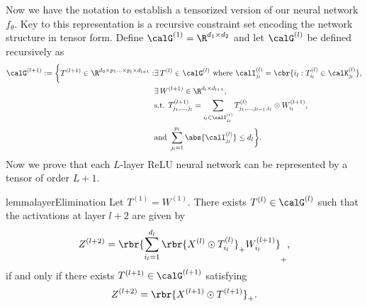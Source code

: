 Now we have the notation to establish a tensorized version of our neural
network \( f_\theta \).
Key to this representation is a recursive constraint set encoding the network
structure in tensor form.
Define \( \calG^{(1)} = \R^{d_1 \times d_2} \) and let \( \calG^{(l)} \)
be defined recursively as
\begin{equation}\label{eq:rank-tensor-decomp}
    \begin{aligned}
        \calG^{(l+1)}
        :=
        \bigg\{
        T^{(l+1)} \in \R^{d_{0} \times p_{1} \ldots \times p_{l} \times d_{l+1}}
        : & \exists \, T^{(l)} \in \calG^{(l)} \text{ where }
        \calI^{(l)}_{j_{l}} = \cbr{ i_l : T^{(l)}_{i_l} \in \calK^{(l)}_{j_{l}}}, \\
          & \exists \, W^{(l+1)} \in \R^{d_l \times d_{l+1}},                     \\
          & \text{s.t. } T^{(l+1)}_{j_1, \ldots, j_{l}}
        = \sum_{i_l \in \calI^{(l)}_{j_l}} T^{(l)}_{j_1, \ldots, j_{l-1}, i_{l}}
        \otimes
        W^{(l+1)}_{i_l},                                                          \\
          & \text{and } \sum_{j_l = 1}^{p_l} \abs{\calI^{(l)}_{j_l}} \leq d_{l}
        \bigg\}.
    \end{aligned}
\end{equation}
Now we prove that each \( L \)-layer ReLU neural network can be
represented by a tensor of order \( L+1 \).
\begin{restatable}{lemma}{layerElimination}\label{lemma:layer-elimination}
    Let \( T^{(1)} = W^{(1)} \).
    There exists \( T^{(l)} \in \calG^{(l)} \) such that
    the activations at layer \( l+2 \) are given by
    \begin{equation}\label{eq:layer-to-tensorize}
        Z^{(l+2)} =
        \rbr{\sum_{i_l=1}^{d_l} \rbr{X^{(l)} \odot T^{(l)}_{i_l}}_+
            W^{(l+1)}_{i_l}}_+,
    \end{equation}
    if and only if there exists \( T^{(l+1)} \in \calG^{(l+1)} \) satisfying
    \[
        Z^{(l+2)} = \rbr{X^{(l+1)} \odot T^{(l+1)}}_+.
    \]
\end{restatable}

